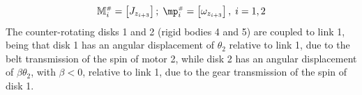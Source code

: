 \documentclass[a4paper,11pt,brazil,fleqn]{article}
\begin{document}
\begin{equation}\label{eq:DiscsModel3}
\mM\ssh_i = \begin{bmatrix} J_{z_{i+3}} \end{bmatrix}; \; \mp\ssh_i = \begin{bmatrix} \omega_{z_{i+3}} \end{bmatrix}, \; i = 1, 2
\end{equation}
The counter-rotating disks 1 and 2 (rigid bodies 4 and 5) are coupled to link 1, being that disk 1 has an angular displacement of $\theta_2$ relative to link 1, due to the belt transmission of the spin of motor 2, while disk 2 has an angular displacement of $\beta\theta_2$, with $\beta < 0$, relative to link 1, due to the gear transmission of the spin of disk 1.
\end{document}
